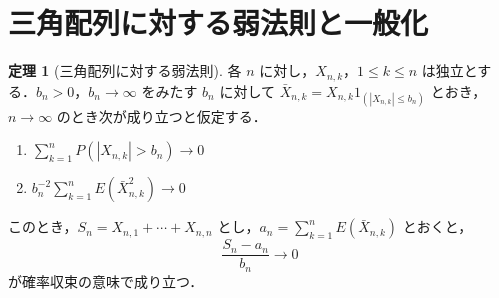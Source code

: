 \documentclass[dvipdfmx]{jsarticle}
\numberwithin{equation}{section}
\theoremstyle{definition}
\newtheorem{thm}{定理}[section]
\newcommand{\0}{\bm{0}}
\newcommand{\1}{\bm{1}}
\begin{document}
\section{三角配列に対する弱法則と一般化}
\begin{thm}[三角配列に対する弱法則]
各 $n$ に対し，$X_{n,k}$，$1 \le k \le n$ は独立とする．$b_n > 0$，$b_n \to \infty$ をみたす $b_n$ に対して $\bar{X}_{n,k} = X_{n,k} 1_{(|X_{n,k}| \le b_n)}$ とおき，$n \to \infty$ のとき次が成り立つと仮定する．
  \begin{enumerate}
    \item[(i)] $\displaystyle \sum_{k=1}^n P(|X_{n,k}| > b_n) \to 0$
    \item[(ii)] $\displaystyle b_n^{-2} \sum_{k=1}^n E(\bar{X}_{n,k}^2) \to 0$
  \end{enumerate}
このとき，$S_n = X_{n,1} + \cdots + X_{n,n}$ とし，$a_n = \sum_{k=1}^n E(\bar{X}_{n,k})$ とおくと，
\[
\frac{S_n - a_n}{b_n} \to 0
\]
が確率収束の意味で成り立つ．
\end{thm}
\end{document}
